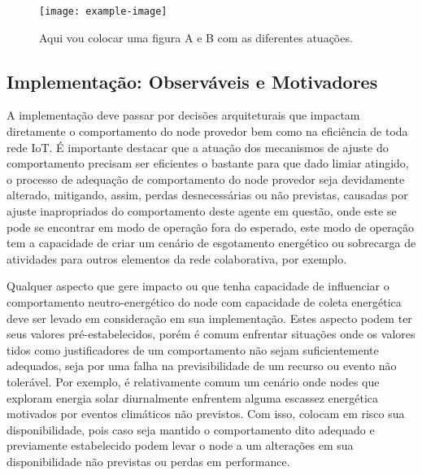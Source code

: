 \begin{figure}[h]
\noindent\texttt{[image: example-image]} 
\caption{Aqui vou colocar uma figura A e B com as diferentes atuações.}
\centering
\end{figure}


\subsection{Implementação: Observáveis e Motivadores}

A implementação deve passar por decisões arquiteturais que impactam diretamente o comportamento do node provedor bem como na eficiência de toda rede \ac{IoT}. É importante destacar que a atuação dos mecanismos de ajuste do comportamento precisam ser eficientes o bastante para que dado limiar atingido, o processo de adequação de comportamento do node provedor seja devidamente alterado, mitigando, assim, perdas desnecessárias ou não previstas, causadas por ajuste inapropriados do comportamento deste agente em questão, onde este se pode se encontrar em modo de operação fora do esperado, este modo de operação tem a capacidade de criar um cenário de esgotamento energético ou sobrecarga de atividades para outros elementos da rede colaborativa, por exemplo.

Qualquer aspecto que gere impacto ou que tenha capacidade de influenciar o comportamento neutro-energético do node com capacidade de coleta energética deve ser levado em consideração em sua implementação. Estes aspecto podem ter seus valores pré-estabelecidos, porém é comum enfrentar situações onde os valores tidos como justificadores de um comportamento não sejam suficientemente adequados, seja por uma falha na previsibilidade de um recurso ou evento não tolerável. Por exemplo, é relativamente comum um cenário onde nodes que exploram energia solar diurnalmente enfrentem alguma escassez energética motivados por eventos climáticos não previstos. Com isso, colocam em risco sua disponibilidade, pois caso seja mantido o comportamento dito adequado e previamente estabelecido podem levar o node a um alterações em sua disponibilidade não previstas ou perdas em performance. 

